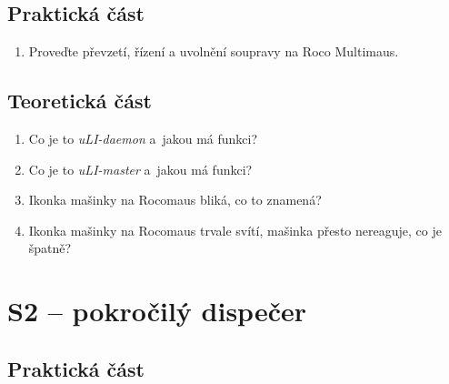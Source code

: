 \documentclass[12pt,a4paper]{article}
\begin{document}
\subsection{Praktická část}

\begin{enumerate}[leftmargin=*]
\item Proveďte převzetí, řízení a uvolnění soupravy na Roco Multimaus.
\end{enumerate}

\subsection{Teoretická část}

\begin{enumerate}[leftmargin=*]
\item Co je to \textit{uLI-daemon} a~jakou má funkci?
\item Co je to \textit{uLI-master} a~jakou má funkci?
\item Ikonka mašinky na Rocomaus bliká, co to znamená?
\item Ikonka mašinky na Rocomaus trvale svítí, mašinka přesto nereaguje, co je
špatně?
\end{enumerate}


\newpage
\section{S2 – pokročilý dispečer}

\subsection{Praktická část}
\end{document}

